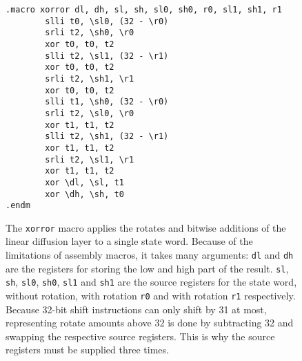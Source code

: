 \begin{figure}
\begin{verbatim}
.macro xorror dl, dh, sl, sh, sl0, sh0, r0, sl1, sh1, r1
        slli t0, \sl0, (32 - \r0)
        srli t2, \sh0, \r0
        xor t0, t0, t2
        slli t2, \sl1, (32 - \r1)
        xor t0, t0, t2
        srli t2, \sh1, \r1
        xor t0, t0, t2
        slli t1, \sh0, (32 - \r0)
        srli t2, \sl0, \r0
        xor t1, t1, t2
        slli t2, \sh1, (32 - \r1)
        xor t1, t1, t2
        srli t2, \sl1, \r1
        xor t1, t1, t2
        xor \dl, \sl, t1
        xor \dh, \sh, t0
.endm
\end{verbatim}

\caption{The \texttt{xorror} macro applies the rotates and bitwise additions of
the linear diffusion layer to a single state word. Because of the limitations of
assembly macros, it takes many arguments:
\texttt{dl} and \texttt{dh} are the registers for storing the low and high part
of the result. \texttt{sl}, \texttt{sh}, \texttt{sl0}, \texttt{sh0},
\texttt{sl1} and \texttt{sh1} are the source registers for the state word,
without rotation, with rotation \texttt{r0} and with rotation \texttt{r1}
respectively. Because 32-bit shift instructions can only shift by 31 at most,
representing rotate amounts above 32 is done by subtracting 32 and swapping the
respective source registers. This is why the source registers must be supplied
three times.}
\label{xorror}
\end{figure}
